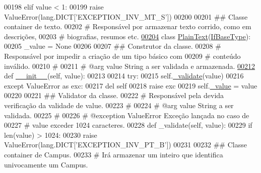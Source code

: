 \begin{DoxyCode}
00198         \textcolor{keywordflow}{elif} value < 1:
00199             \textcolor{keywordflow}{raise} ValueError(lang.DICT[\textcolor{stringliteral}{'EXCEPTION\_INV\_MT\_S'}])
00200         
00201 \textcolor{comment}{## Classe container de texto.}
00202 \textcolor{comment}{#   Responsável por armazenar texto corrido, como em descrições,}
00203 \textcolor{comment}{#   biografias, resumos etc.}
\hypertarget{BaseUnit_8py_source_l00204}{}\hyperlink{classELO_1_1BaseUnit_1_1PlainText}{00204} \textcolor{keyword}{class }\hyperlink{classELO_1_1BaseUnit_1_1PlainText}{PlainText}(\hyperlink{classELO_1_1BaseUnit_1_1IfBaseType}{IfBaseType}):
00205     \_value = \textcolor{keywordtype}{None}
00206 
00207     \textcolor{comment}{## Construtor da classe.}
00208     \textcolor{comment}{#   Responsável por impedir a criação de um tipo básico com}
00209     \textcolor{comment}{#   conteúdo inválido.}
00210     \textcolor{comment}{#}
00211     \textcolor{comment}{#   @arg value String a ser validada e armazenada.}
\hypertarget{BaseUnit_8py_source_l00212}{}\hyperlink{classELO_1_1BaseUnit_1_1PlainText_a7abd53e71b4a59f484fdd94d7b26eac4}{00212}     \textcolor{keyword}{def }\hyperlink{classELO_1_1BaseUnit_1_1PlainText_a7abd53e71b4a59f484fdd94d7b26eac4}{\_\_init\_\_}(self, value):
00213 
00214         \textcolor{keywordflow}{try}:
00215             self.\hyperlink{classELO_1_1BaseUnit_1_1IfBaseType_acf84c5906a39b605a23ab68c4ca1dd19}{\_validate}(value)
00216         \textcolor{keywordflow}{except} ValueError \textcolor{keyword}{as} exc:
00217             del self
00218             \textcolor{keywordflow}{raise} exc
00219         self.\hyperlink{classELO_1_1BaseUnit_1_1IfBaseType_ad05d9d377fc4b99743c022cc8f6019d7}{\_value} = value
00220 
00221     \textcolor{comment}{## Validator da classe.}
00222     \textcolor{comment}{#   Responsável pela devida verificação da validade de value.}
00223     \textcolor{comment}{#}
00224     \textcolor{comment}{#   @arg        value       String a ser validada.}
00225     \textcolor{comment}{#}
00226     \textcolor{comment}{#   @exception  ValueError  Exceção lançada no caso de}
00227     \textcolor{comment}{#                           value exceder 1024 caracteres.}
00228     \textcolor{keyword}{def }\_validate(self, value):
00229         \textcolor{keywordflow}{if} len(value) > 1024:
00230             \textcolor{keywordflow}{raise} ValueError(lang.DICT[\textcolor{stringliteral}{'EXCEPTION\_INV\_PT\_B'}])
00231 
00232 \textcolor{comment}{## Classe container de Campus.}
00233 \textcolor{comment}{#   Irá armazenar um inteiro que identifica univocamente um Campus.}

\end{DoxyCode}
